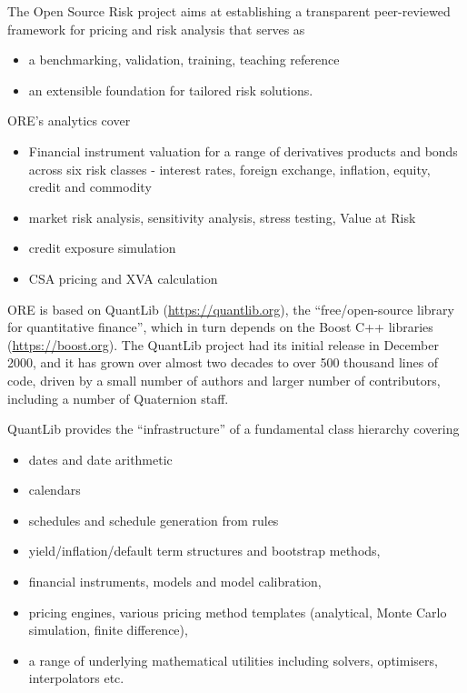 \documentclass[12pt, a4paper]{report}
\begin{document}
The Open Source Risk project aims at establishing a transparent peer-reviewed framework for pricing and risk analysis that serves as

\begin{itemize}
\item a benchmarking, validation, training, teaching reference
\item an extensible foundation for tailored risk solutions.
\end{itemize}

ORE's analytics cover
\begin{itemize}
\item Financial instrument valuation for a range of derivatives products and bonds across six risk classes - interest rates, foreign exchange, inflation, equity, credit and commodity
\item market risk analysis, sensitivity analysis, stress testing, Value at Risk
\item credit exposure simulation
\item CSA pricing and XVA calculation
\end{itemize}

ORE is based on QuantLib (\url{https://quantlib.org}), the ``free/open-source library for quantitative finance'', which in turn depends on the Boost C++ libraries (\url{https://boost.org}). 
The QuantLib project had its initial release in December 2000, and it has grown over almost two decades to over 500 thousand lines of code, driven by a small number of authors and larger number of contributors, including a number of Quaternion staff.

QuantLib provides the ``infrastructure'' of a fundamental class hierarchy covering 
\begin{itemize}
\item dates and date arithmetic
\item calendars
\item schedules and schedule generation from rules
\item yield/inflation/default term structures and bootstrap methods,
\item financial instruments, models and model calibration, 
\item pricing engines, various pricing method templates (analytical, Monte Carlo simulation, finite difference),
\item a range of underlying mathematical utilities including solvers, optimisers, interpolators etc.
\end{itemize}
\end{document}
